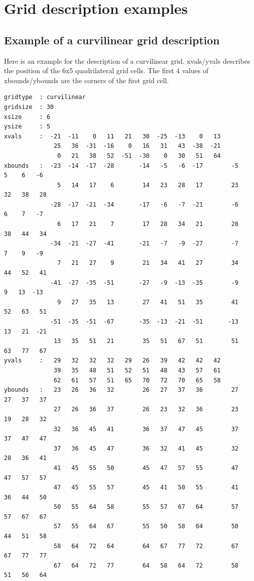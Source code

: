 \appendix

\chapter{\label{appendixa}Grid description examples}

\section{Example of a curvilinear grid description}
Here is an example for the \CDO description of a curvilinear grid.
xvals/yvals describes the position of the 6x5 quadrilateral grid cells.
The first 4 values of xbounds/ybounds are the corners of the first grid cell.
\begin{lstlisting}[frame=single, backgroundcolor=\color{zebg}, basicstyle=\footnotesize]
gridtype  : curvilinear
gridsize  : 30
xsize     : 6
ysize     : 5
xvals     :  -21  -11    0   11   21   30  -25  -13    0   13
              25   36  -31  -16    0   16   31   43  -38  -21
               0   21   38   52  -51  -30    0   30   51   64
xbounds   :  -23  -14  -17  -28       -14   -5   -6  -17        -5    5    6   -6
               5   14   17    6        14   23   28   17        23   32   38   28
             -28  -17  -21  -34       -17   -6   -7  -21        -6    6    7   -7
               6   17   21    7        17   28   34   21        28   38   44   34
             -34  -21  -27  -41       -21   -7   -9  -27        -7    7    9   -9
               7   21   27    9        21   34   41   27        34   44   52   41
             -41  -27  -35  -51       -27   -9  -13  -35        -9    9   13  -13
               9   27   35   13        27   41   51   35        41   52   63   51
             -51  -35  -51  -67       -35  -13  -21  -51       -13   13   21  -21
              13   35   51   21        35   51   67   51        51   63   77   67
yvals     :   29   32   32   32   29   26   39   42   42   42
              39   35   48   51   52   51   48   43   57   61
              62   61   57   51   65   70   72   70   65   58
ybounds   :   23   26   36   32        26   27   37   36        27   27   37   37
              27   26   36   37        26   23   32   36        23   19   28   32
              32   36   45   41        36   37   47   45        37   37   47   47
              37   36   45   47        36   32   41   45        32   28   36   41
              41   45   55   50        45   47   57   55        47   47   57   57
              47   45   55   57        45   41   50   55        41   36   44   50
              50   55   64   58        55   57   67   64        57   57   67   67
              57   55   64   67        55   50   58   64        50   44   51   58
              58   64   72   64        64   67   77   72        67   67   77   77
              67   64   72   77        64   58   64   72        58   51   56   64
\end{lstlisting}

